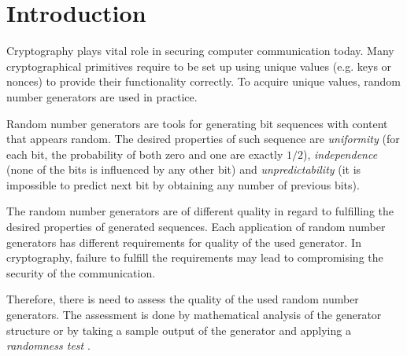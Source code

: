 \documentclass[
  digital,     %
  oneside,     %
  nosansbold,  %
  nocolorbold, %
  nolof,         %
  nolot,         %
]{fithesis4}
\begin{document}
\chapter*{Introduction}

Cryptography plays vital role in securing computer communication today. Many cryptographical primitives require to be set up using unique values (e.g. keys or nonces) to provide their functionality correctly. To acquire unique values, random number generators are used in practice.


Random number generators are tools for generating bit sequences with content that appears random. The desired properties \cite[p.~1-1]{nist_special} of such sequence are \emph{uniformity} (for each bit, the probability of both zero and one are exactly $1/2$), \emph{independence} (none of the bits is influenced by any other bit) and \emph{unpredictability} (it is impossible to predict next bit by obtaining any number of previous bits). 

The random number generators are of different quality in regard to fulfilling the desired properties of generated sequences. Each application of random number generators has different requirements for quality of the used generator. In cryptography, failure to fulfill the requirements may lead to compromising the security of the communication.

Therefore, there is need to assess the quality of the used random number generators. The assessment is done by mathematical analysis of the generator structure or by taking a sample output of the generator and applying a \emph{randomness test} \cite[p.~2]{tu01_guide}.
\end{document}
